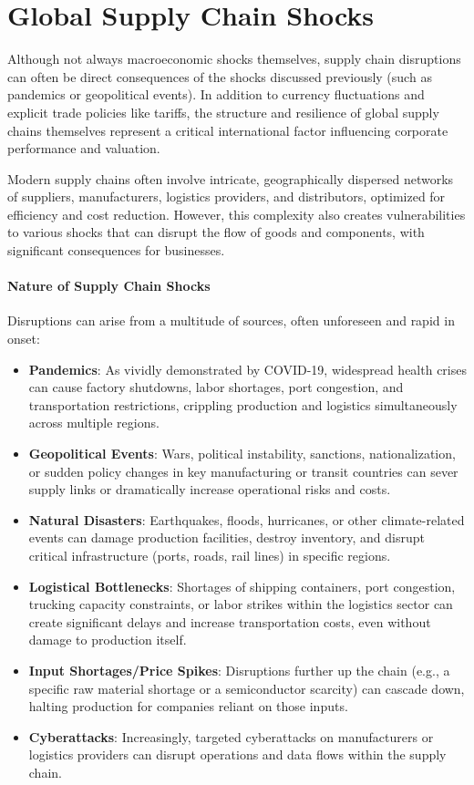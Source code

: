 \section{Global Supply Chain Shocks} \label{sec:supply_chain_shocks}
Although not always macroeconomic shocks themselves, supply chain disruptions can often be direct consequences of the shocks discussed previously (such as pandemics or geopolitical events). In addition to currency fluctuations and explicit trade policies like tariffs, the structure and resilience of global supply chains themselves represent a critical international factor influencing corporate performance and valuation.

Modern supply chains often involve intricate, geographically dispersed networks of suppliers, manufacturers, logistics providers, and distributors, optimized for efficiency and cost reduction. However, this complexity also creates vulnerabilities to various shocks that can disrupt the flow of goods and components, with significant consequences for businesses.

\paragraph{Nature of Supply Chain Shocks}
Disruptions can arise from a multitude of sources, often unforeseen and rapid in onset:
\begin{itemize}
    \item \textbf{Pandemics}: As vividly demonstrated by COVID-19, widespread health crises can cause factory shutdowns, labor shortages, port congestion, and transportation restrictions, crippling production and logistics simultaneously across multiple regions.
    \item \textbf{Geopolitical Events}: Wars, political instability, sanctions, nationalization, or sudden policy changes in key manufacturing or transit countries can sever supply links or dramatically increase operational risks and costs.
    \item \textbf{Natural Disasters}: Earthquakes, floods, hurricanes, or other climate-related events can damage production facilities, destroy inventory, and disrupt critical infrastructure (ports, roads, rail lines) in specific regions.
    \item \textbf{Logistical Bottlenecks}: Shortages of shipping containers, port congestion, trucking capacity constraints, or labor strikes within the logistics sector can create significant delays and increase transportation costs, even without damage to production itself.
    \item \textbf{Input Shortages/Price Spikes}: Disruptions further up the chain (e.g., a specific raw material shortage or a semiconductor scarcity) can cascade down, halting production for companies reliant on those inputs.
    \item \textbf{Cyberattacks}: Increasingly, targeted cyberattacks on manufacturers or logistics providers can disrupt operations and data flows within the supply chain.
\end{itemize}

